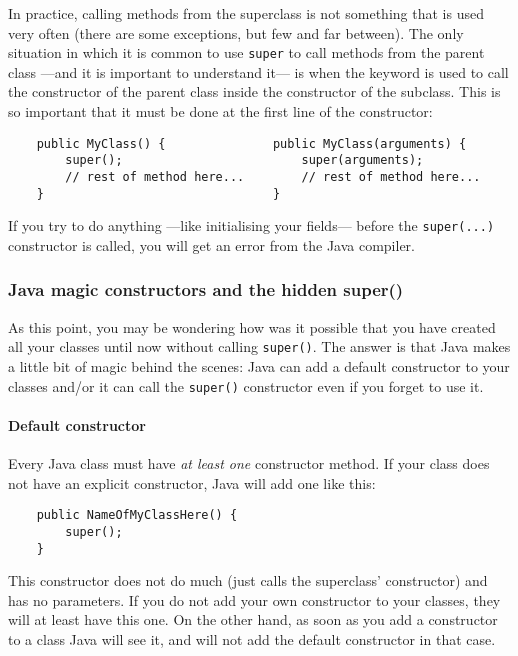 In practice, calling methods from the superclass is not something that
is used very often (there are some exceptions, but few and far
between). 
The only situation in which it is common to use \verb+super+ to call
methods from the parent class ---and it is important to understand
it--- is when the keyword is used to call the constructor of the parent class
inside the constructor of the subclass. This is so important that it must be
done at the first line of the constructor: 

\begin{verbatim}
    public MyClass() {               public MyClass(arguments) {
        super();                         super(arguments);
        // rest of method here...        // rest of method here...    
    }                                }
\end{verbatim}

If you try to do anything ---like initialising your fields--- before
the \verb+super(...)+ constructor is called, you will get an error
from the Java compiler. 

\subsubsection*{Java magic constructors and the hidden super()}
\label{sec:hidden-super}

As this point, you may be wondering how was it possible that you have
created all your classes until now without calling \verb+super()+. The
answer is that Java makes a little bit of magic behind the scenes:
Java can add a default constructor to your classes and/or it can call
the \verb+super()+ constructor even if you forget to use it. 

\paragraph{Default constructor}
\label{sec:default-constructor}

Every Java class must have \emph{at least one} constructor method. If your
class does not have an explicit constructor, Java will add one like
this: 

\begin{verbatim}
    public NameOfMyClassHere() {
        super();
    }
\end{verbatim}

This constructor does not do much (just calls the superclass'
constructor) and has no parameters. If you do not add your own
constructor to your classes, they will at least have this one. On the
other hand, as soon as you add a constructor to a class Java will see
it, and will not add the default constructor in that case.

